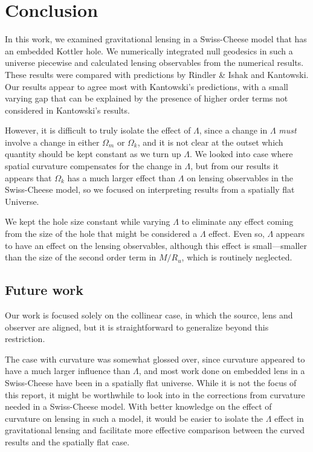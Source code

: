 \chapter{Conclusion}
\label{chapter:conclusion}

In this work, we examined gravitational lensing in a Swiss-Cheese model that has an embedded Kottler hole. We numerically integrated null geodesics in such a universe piecewise and calculated lensing observables from the numerical results. These results were compared with predictions by Rindler \& Ishak and Kantowski. Our results appear to agree most with Kantowski's predictions, with a small varying gap that can be explained by the presence of higher order terms not considered in Kantowski's results. 

However, it is difficult to truly isolate the effect of $\Lambda$, since a change in $\Lambda$ \emph{must} involve a change in either $\Omega_m$ or $\Omega_k$, and it is not clear at the outset which quantity should be kept constant as we turn up $\Lambda$. We looked into case where spatial curvature compensates for the change in $\Lambda$, but from our results it appears that $\Omega_k$ has a much larger effect than $\Lambda$ on lensing observables in the Swiss-Cheese model, so we focused on interpreting results from a spatially flat Universe. 

We kept the hole size constant while varying $\Lambda$ to eliminate any effect coming from the size of the hole that might be considered a $\Lambda$ effect. Even so, $\Lambda$ appears to have an effect on the lensing observables, although this effect is small---smaller than the size of the second order term in $M/R_u$, which is routinely neglected. 

\section{Future work}

Our work is focused solely on the collinear case, in which the source, lens and observer are aligned, but it is straightforward to generalize beyond this restriction. 

The case with curvature was somewhat glossed over, since curvature appeared to have a much larger influence than $\Lambda$, and most work done on embedded lens in a Swiss-Cheese have been in a spatially flat universe. While it is not the focus of this report, it might be worthwhile to look into in the corrections from curvature needed in a Swiss-Cheese model.  With better knowledge on the effect of curvature on lensing in such a model, it would be easier to isolate the $\Lambda$ effect in gravitational lensing and facilitate more effective comparison between the curved results and the spatially flat case. 

